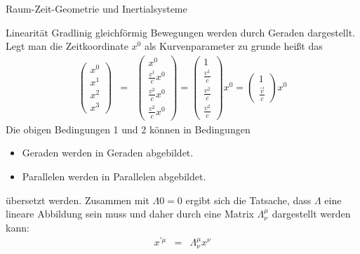 \begin{chapter}{\titlestr}
\begin{section}{Raum-Zeit-Geometrie und Inertialsysteme}
\begin{subsection}{Linearität}
Gradlinig gleichförmig Bewegungen werden durch Geraden dargestellt. Legt man die Zeitkoordinate $x^0$ als Kurvenparameter zu grunde heißt das
\begin{eqnarray*}
\begin{pmatrix}
x^0\\x^1\\x^2\\x^3
\end{pmatrix}
&=&
\begin{pmatrix}
x^0\\ \frac{v^1}{c}x^0\\ \frac{v^2}{c}x^0\\ \frac{v^2}{c}x^0
\end{pmatrix}
=
\begin{pmatrix}
1\\ \frac{v^1}{c}\\ \frac{v^2}{c}\\ \frac{v^2}{c}
\end{pmatrix}x^0
=\begin{pmatrix}
1\\ \frac{\vec{v}}{c}
\end{pmatrix}x^0
\end{eqnarray*}
Die obigen Bedingungen 1 und 2 können in Bedingungen
\begin{itemize}
	\item Geraden werden in Geraden abgebildet.
	\item Parallelen werden in Parallelen abgebildet.
\end{itemize}
übersetzt werden. Zusammen mit $\Lambda 0 = 0$ ergibt sich die Tatsache, dass $\Lambda$ eine lineare Abbildung sein muss und daher durch eine Matrix $\Lambda^\mu_\nu$ dargestellt werden kann:
\begin{eqnarray*}
x^{\prime\mu} &=& \Lambda^\mu_\nu x^\nu
\end{eqnarray*}
\end{subsection}


\end{section}
\end{chapter}
